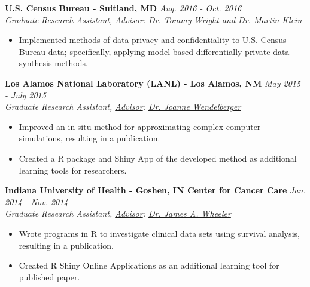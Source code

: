 \workspace
    \textbf{U.S. Census Bureau - Suitland, MD} \hfill \textit{Aug. 2016 - Oct. 2016}\\
    \textit{Graduate Research Assistant, \underline{Advisor}: Dr. Tommy Wright and Dr. Martin Klein}
    \begin{itemize}
        \item Implemented methods of data privacy and confidentiality to U.S. Census Bureau data; specifically, applying model-based differentially private data synthesis methods.
    \end{itemize}
    

\workspace
    \textbf{Los Alamos National Laboratory (LANL) - Los Alamos, NM} \hfill \textit{May 2015 - July 2015}\\
    \textit{Graduate Research Assistant, \underline{Advisor}:  \href{http://www.lanl.gov/expertise/profiles/view/joanne-wendelberger}{Dr. Joanne Wendelberger}}
    \begin{itemize}
        \item Improved an in situ method for approximating complex computer simulations, resulting in a publication. 
        \item Created a R package and Shiny App of the developed method as additional learning tools for researchers.
    \end{itemize}
    
\workspace
    \textbf{Indiana University of Health - Goshen, IN Center for Cancer Care} \hfill \textit{Jan. 2014 - Nov. 2014}\\
    \textit{Graduate Research Assistant, \underline{Advisor}: \href{http://iuhealth.org/find-a-doctor/physician/69771/}{Dr. James A. Wheeler}}
    \begin{itemize}
        \item Wrote programs in R to investigate clinical data sets using survival analysis, resulting in a publication.
        \item Created R Shiny Online Applications as an additional learning tool for published paper.
    \end{itemize}
    
